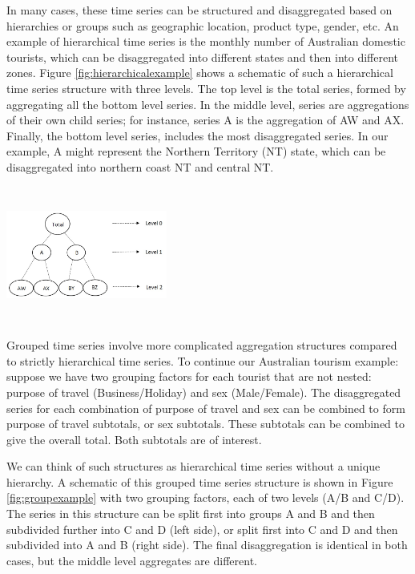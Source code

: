 \documentclass[11pt,a4paper,]{article}
\let\origfigure\figure
\let\endorigfigure\endfigure
\renewenvironment{figure}[1][2] {
    \expandafter\origfigure\expandafter[!htbp]
} {
    \endorigfigure
}
\begin{document}
In many cases, these time series can be structured and disaggregated based on hierarchies or groups such as geographic location, product type, gender, etc. An example of hierarchical time series is the monthly number of Australian domestic tourists, which can be disaggregated into different states and then into different zones. Figure \ref{fig:hierarchicalexample} shows a schematic of such a hierarchical time series structure with three levels. The top level is the total series, formed by aggregating all the bottom level series. In the middle level, series are aggregations of their own child series; for instance, series A is the aggregation of AW and AX. Finally, the bottom level series, includes the most disaggregated series. In our example, A might represent the Northern Territory (NT) state, which can be disaggregated into northern coast NT and central NT.

\begin{figure}

{\centering \includegraphics[width=200px,height=170px,trim=0 0 190 0,clip=true]{Paper-Figures/hierarchical_example} 

}

\caption{An example of a two level hierarchical structure.}\label{fig:hierarchicalexample}
\end{figure}

Grouped time series involve more complicated aggregation structures compared to strictly hierarchical time series. To continue our Australian tourism example: suppose we have two grouping factors for each tourist that are not nested: purpose of travel (Business/Holiday) and sex (Male/Female). The disaggregated series for each combination of purpose of travel and sex can be combined to form purpose of travel subtotals, or sex subtotals. These subtotals can be combined to give the overall total. Both subtotals are of interest.

We can think of such structures as hierarchical time series without a unique hierarchy. A schematic of this grouped time series structure is shown in Figure \ref{fig:groupexample} with two grouping factors, each of two levels (A/B and C/D). The series in this structure can be split first into groups A and B and then subdivided further into C and D (left side), or split first into C and D and then subdivided into A and B (right side). The final disaggregation is identical in both cases, but the middle level aggregates are different.
\end{document}
